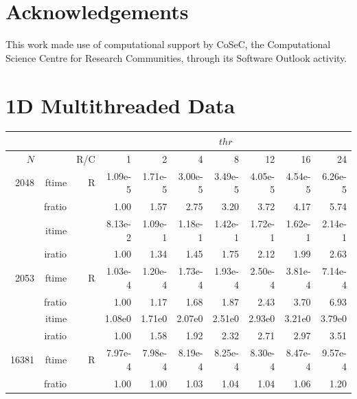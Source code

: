 \documentclass[a4paper]{article}
\begin{document}
\section*{Acknowledgements}
This work made use of computational support by CoSeC, the
Computational Science Centre for Research Communities, through its
Software Outlook activity.




\clearpage

\appendix

\section{1D Multithreaded Data}\label{App:1Dthr}


\begin{table}[!htbp]
\begin{center}
\begin{small}
\begin{tabular}{|r|r|r|r|r|r|r|r|r|r|}
\hline 
     \multicolumn{3}{|c|}{ } & \multicolumn{7}{c|}{$thr$} \\ \hline
    $N$  & & R/C  & 1           & 2    & 4    & 8    & 12   & 16    & 24  \\ \hline\hline
    2048  & ftime & R  &  1.09e-5 &   1.71e-5 &   3.00e-5 &   3.49e-5 &   4.05e-5 &   4.54e-5 &   6.26e-5   \\ 
      & fratio & & 1.00 &    1.57 &    2.75 &    3.20 &    3.72 &    4.17 &    5.74   \\ 
     & itime & &  8.13e-2 &    1.09e-1 &   1.18e-1 &   1.42e-1 &   1.72e-1 &   1.62e-1 &   2.14e-1    \\ 
     & iratio & &   1.00 &    1.34 &    1.45 &    1.75 &    2.12 &    1.99 &    2.63    \\ \hline 
    2053  & ftime & R &  1.03e-4 &   1.20e-4 &   1.73e-4 &   1.93e-4 &   2.50e-4 &   3.81e-4 &   7.14e-4    \\ 
      & fratio & & 1.00 &   1.17 &   1.68 &   1.87 &   2.43 &   3.70 &   6.93    \\ 
     & itime &  &   1.08e0 &   1.71e0 &   2.07e0 &   2.51e0 &   2.93e0 &   3.21e0 &   3.79e0   \\ 
    & iratio &  &     1.00 &   1.58 &   1.92 &   2.32 &   2.71 &   2.97 &   3.51     \\ \hline 
  16381  & ftime & R &  7.97e-4 &   7.98e-4 &   8.19e-4 &   8.25e-4 &   8.30e-4 &   8.47e-4 &   9.57e-4     \\ 
      & fratio & &  1.00 &   1.00 &   1.03 &   1.04 &   1.04 &   1.06 &   1.20    \\ 

\end{tabular}
\end{small}
\end{center}
\end{table}
\end{document}
